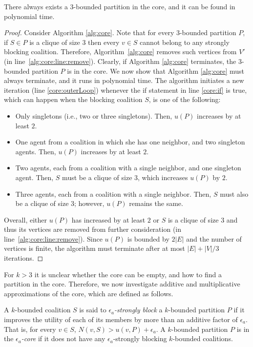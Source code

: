 \documentclass[sigconf,anonymous]{aamas}
\begin{document}
\begin{theorem}
There always exists a $3$-bounded partition in the core, and it can be found in polynomial time.
\end{theorem}

\begin{proof}
Consider Algorithm \ref{alg:core}.
Note that for every $3$-bounded partition $P$, if $S \in P$ is a clique of size $3$ then every $v \in S$ cannot belong to any strongly blocking coalition. 
Therefore, Algorithm~\ref{alg:core} removes such vertices from $V'$ (in line~\ref{alg:core:line:remove}).
Clearly, if Algorithm \ref{alg:core} terminates, the $3$-bounded partition $P$ is in the core.
We now show that Algorithm \ref{alg:core} must always terminate, and it runs in polynomial time.
The algorithm initiates a new iteration (line  \ref{core:outerLoop}) whenever the if statement in line \ref{core:if} is true, which can happen when the blocking coalition $S$, is one of the following:
\begin{itemize}
    \item Only singletons (i.e., two or three singletons). Then, $u(P)$ increases by at least $2$.
    \item One agent from a coalition in which she has one neighbor, and two singleton agents. Then, $u(P)$ increases by at least $2$.
    \item Two agents, each from a coalition with a single neighbor, and one singleton agent. Then, $S$ must be a clique of size $3$, which increases $u(P)$ by $2$.
    \item Three agents, each from a coalition with a single neighbor. Then, $S$ must also be a clique of size $3$; however, $u(P)$ remains the same.
\end{itemize}
Overall, either $u(P)$ has increased by at least $2$ or $S$ is a clique of size $3$ and thus its vertices are removed from further consideration (in line~\ref{alg:core:line:remove}). %
Since $u(P)$ is bounded by $2|E|$ and the number of vertices is finite, the algorithm must terminate after at most $|E|+|V|/3$ iterations.
\end{proof}


For $k>3$ it is unclear whether the core can be empty, and how to find a partition in the core. Therefore, we now investigate additive and multiplicative approximations of the core, which are defined as follows. %
%
\begin{definition}
A $k$-bounded coalition $S$ is said to \emph{$\epsilon_a$-strongly block} a $k$-bounded partition $P$ if it improves the utility of each of its members by more than an additive factor of $\epsilon_a$. That is, for every $v \in S$, $N(v,S) > u(v,P) + \epsilon_a$.
A $k$-bounded partition $P$ is in the \emph{$\epsilon_a$-core} if it does not have any $\epsilon_a$-strongly blocking $k$-bounded coalitions.
\end{definition}
\end{document}
